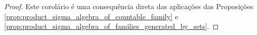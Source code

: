 \begin{proof}
    Este corolário é uma consequência direta das aplicações das Proposições \ref{prop:product_sigma_algebra_of_countable_family} e \ref{prop:product_sigma_algebra_of_families_generated_by_sets}.
\end{proof}